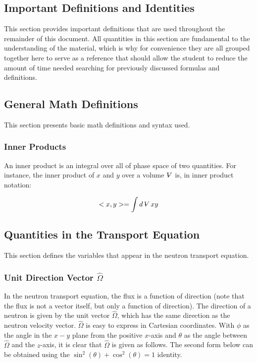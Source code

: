 \documentclass[10pt]{article}
\newcommand{\beq}{\begin{equation}}
\newcommand{\eeq}{\end{equation}}
\newcommand{\hO}{\hat{\Omega}}
\newcommand{\volume}{\mathop{\ooalign{\hfil$V$\hfil\cr\kern0.08em--\hfil\cr}}\nolimits}
\begin{document}
\begin{flushleft}
\clearpage
\section{Important Definitions and Identities}

This section provides important definitions that are used throughout the remainder of this document. All quantities in this section are fundamental to the understanding of the material, which is why for convenience they are all grouped together here to serve as a reference that should allow the student to reduce the amount of time needed searching for previously discussed formulas and definitions.

\subsection{General Math Definitions}
This section presents basic math definitions and syntax used.

\subsubsection{Inner Products}

An inner product is an integral over all of phase space of two quantities. For instance, the inner product of \(x\) and \(y\) over a volume \(\volume\) is, in inner product notation:

\beq
\label{eq:innerproduct}
< x, y > = \int d\volume xy
\eeq

\subsection{Quantities in the Transport Equation}
This section defines the variables that appear in the neutron transport equation.

\subsubsection{Unit Direction Vector \(\hO  \)}

In the neutron transport equation, the flux is a function of direction (note that the flux is not a vector itself, but only a function of direction). The direction of a neutron is given by the unit vector \(\hO \), which has the same direction as the neutron velocity vector. \(\hO \) is easy to express in Cartesian coordinates. With \(\phi\) as the angle in the \(x-y\) plane from the positive \(x\)-axis and \(\theta\) as the angle between \(\hO \) and the \(z\)-axis, it is clear that \(\hO \) is given as follows. The second form below can be obtained using the \(\sin^2{(\theta)} + \cos^2{(\theta)} = 1\) identity.


\end{flushleft}
\end{document}
